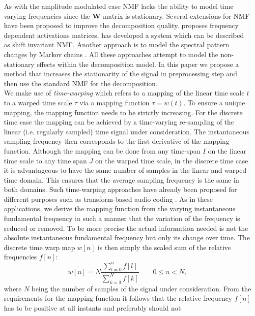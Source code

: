 As with the amplitude modulated case NMF lacks the ability to model time varying frequencies since the $\mathbf{W}$ matrix is stationary. Several extensions for NMF have been proposed to improve the decomposition quality. \cite{hennequin2011nmf} proposes frequency dependent activations matrices, \cite{smaragdis2008sparse} has developed a system which can be described as shift invariant NMF. Another approach is to model the spectral pattern changes by Markov chains \cite{nakano2010nonnegative}. All these approaches attempt to model the non-stationary effects within the decomposition model. In this paper we propose a method that increases the stationarity of the signal in preprocessing step and then use the standard NMF for the decomposition. \\

We make use of \emph{time-warping} which refers to a mapping of the linear
time scale $t$ to a warped time scale $\tau$ via a mapping function
$\tau=w(t)$. To ensure a unique mapping, the mapping function needs to be strictly increasing. For the discrete time case the mapping can be achieved by a time-varying re-sampling of the linear (i.e. regularly sampled) time signal under consideration.
The instantaneous sampling frequency then corresponds to the first derivative of
the mapping function. Although the mapping can be done from any time-span
$I$ on the linear time scale to any time span $J$ on the warped time scale, in
the discrete time case it is advantageous to have the same number of samples
in the linear and warped time domain. This ensures that the average sampling
frequency is the same in both domains. Such time-warping approaches have already
been proposed for different purposes such as transform-based audio coding
\cite{edler2009}. As in these applications, we derive the mapping function from
the varying instantaneous fundamental frequency in such a manner that the variation of the frequency is
reduced or removed. To be more precise the actual information needed is not
the absolute instantaneous fundamental frequency but only its change over time.
The discrete time warp map $w[n]$ is then simply the scaled sum of the relative
frequencies $f[n]$:
\begin{equation}
w[n]=N \frac{\sum^n_{l=0}{f[l]}}{\sum^N_{k=0}{f[k]}}  \qquad 0\leq n<N,
\end{equation}
where $N$ being the number of samples of the signal under consideration.
From the requirements for the mapping function it follows that the relative
frequency $f[n]$ has to be positive at all instants and preferably should not
